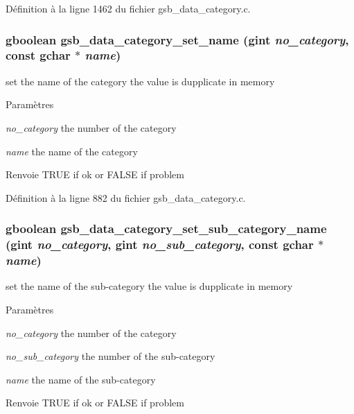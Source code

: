 Définition à la ligne 1462 du fichier gsb\_\-data\_\-category.c.

\subsubsection[{gsb\_\-data\_\-category\_\-set\_\-name}]{\setlength{\rightskip}{0pt plus 5cm}gboolean gsb\_\-data\_\-category\_\-set\_\-name (gint {\em no\_\-category}, \/  const gchar $\ast$ {\em name})}\label{gsb__data__category_8h_a24478d49cde92d7c4b165bd5a746aa6a}
set the name of the category the value is dupplicate in memory


\begin{DoxyParams}{Paramètres}
\item[{\em no\_\-category}]the number of the category \item[{\em name}]the name of the category\end{DoxyParams}
\begin{DoxyReturn}{Renvoie}
TRUE if ok or FALSE if problem 
\end{DoxyReturn}


Définition à la ligne 882 du fichier gsb\_\-data\_\-category.c.

\subsubsection[{gsb\_\-data\_\-category\_\-set\_\-sub\_\-category\_\-name}]{\setlength{\rightskip}{0pt plus 5cm}gboolean gsb\_\-data\_\-category\_\-set\_\-sub\_\-category\_\-name (gint {\em no\_\-category}, \/  gint {\em no\_\-sub\_\-category}, \/  const gchar $\ast$ {\em name})}\label{gsb__data__category_8h_aa34eb73fc8d399e770bfaf0e9dbae579}
set the name of the sub-\/category the value is dupplicate in memory


\begin{DoxyParams}{Paramètres}
\item[{\em no\_\-category}]the number of the category \item[{\em no\_\-sub\_\-category}]the number of the sub-\/category \item[{\em name}]the name of the sub-\/category\end{DoxyParams}
\begin{DoxyReturn}{Renvoie}
TRUE if ok or FALSE if problem 
\end{DoxyReturn}


